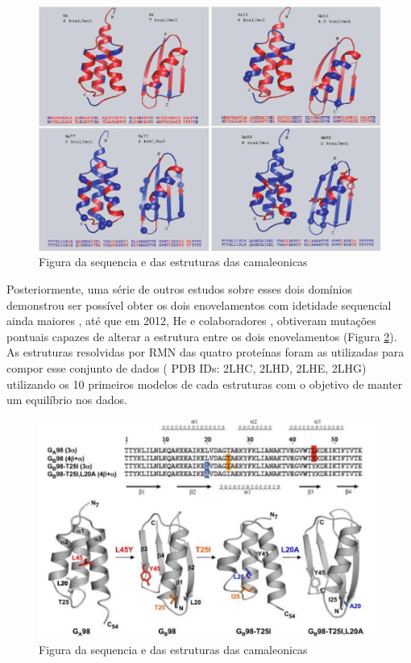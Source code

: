 \begin{figure}
  \centering
  \includegraphics[width=1.0\textwidth]{figures/ga_gb.jpg}
  \caption{Figura da sequencia e das estruturas das camaleonicas}
        \label{fig:ga_gb}
\end{figure}

Posteriormente, uma série de outros estudos sobre esses dois domínios demonstrou ser possível obter os dois enovelamentos com idetidade sequencial ainda maiores \cite{10.1073/pnas.0805857105, 10.1073/pnas.0906408106},  até que em 2012, He e colaboradores \cite{10.1016/j.str.2011.11.018}, obtiveram mutações pontuais capazes de alterar a estrutura entre os dois enovelamentos (Figura \ref{fig:camaleonicas}). As estruturas resolvidas por RMN das quatro proteínas foram as utilizadas para compor esse conjunto de dados ( PDB IDs: 2LHC, 2LHD, 2LHE, 2LHG) utilizando os 10 primeiros modelos de cada estruturas com o objetivo de manter um equilíbrio nos dados.

\begin{figure}
	\centering
	\includegraphics[width=1.0\textwidth]{figures/chameleonic_resume.pdf}
	\caption{Figura da sequencia e das estruturas das camaleonicas}
        \label{fig:camaleonicas}
\end{figure}

